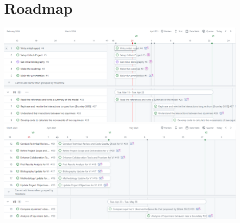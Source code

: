 \documentclass[options]{article}
\begin{document}
\section{Roadmap}
\begin{center}
    \includegraphics[width=0.9\textwidth]{V0/images/roadmapV0_1.png}
    \vspace{1em} %
    \includegraphics[width=0.9\textwidth]{V0/images/roadmapV0_2.png}
\end{center}


\nocite{*}


\end{document}
